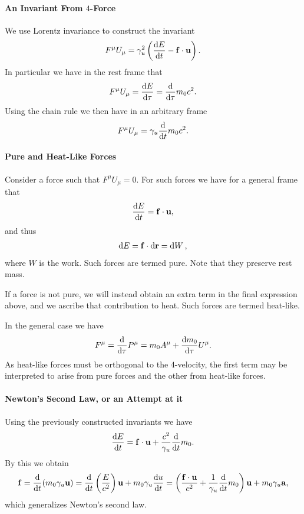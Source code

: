 \paragraph{An Invariant From $4$-Force}
We use Lorentz invariance to construct the invariant
\begin{align*}
	F^{\mu}U_{\mu} = \gamma_{u}^{2}\left(\dv{E}{t} - \vb{f}\cdot\vb{u}\right).
\end{align*}
In particular we have in the rest frame that
\begin{align*}
	F^{\mu}U_{\mu} = \dv{E}{\tau} = \dv{\tau}m_{0}c^{2}.
\end{align*}
Using the chain rule we then have in an arbitrary frame
\begin{align*}
	F^{\mu}U_{\mu} = \gamma_{u}\dv{t}m_{0}c^{2}.
\end{align*}

\paragraph{Pure and Heat-Like Forces}
Consider a force such that $F^{\mu}U_{\mu} = 0$. For such forces we have for a general frame that
\begin{align*}
	\dv{E}{t} = \vb{f}\cdot\vb{u},
\end{align*}
and thus
\begin{align*}
	\dd{E} = \vb{f}\cdot\dd{\vb{r}} = \dd{W},
\end{align*}
where $W$ is the work. Such forces are termed pure. Note that they preserve rest mass.

If a force is not pure, we will instead obtain an extra term in the final expression above, and we ascribe that contribution to heat. Such forces are termed heat-like.

In the general case we have
\begin{align*}
	F^{\mu} = \dv{\tau}P^{\mu} = m_{0}A^{\mu} + \dv{m_{0}}{\tau}U^{\mu}.
\end{align*}
As heat-like forces must be orthogonal to the $4$-velocity, the first term may be interpreted to arise from pure forces and the other from heat-like forces.

\paragraph{Newton's Second Law, or an Attempt at it}
Using the previously constructed invariants we have
\begin{align*}
	\dv{E}{t} = \vb{f}\cdot\vb{u} + \frac{c^{2}}{\gamma_{u}}\dv{t}m_{0}.
\end{align*}
By this we obtain
\begin{align*}
	\vb{f} = \dv{t}(m_{0}\gamma_{u}\vb{u}) = \dv{t}\left(\frac{E}{c^{2}}\right)\vb{u} + m_{0}\gamma_{u}\dv{u}{t} = \left(\frac{\vb{f}\cdot\vb{u}}{c^{2}} + \frac{1}{\gamma_{u}}\dv{t}m_{0}\right)\vb{u} + m_{0}\gamma_{u}\vb{a},
\end{align*}
which generalizes Newton's second law.

